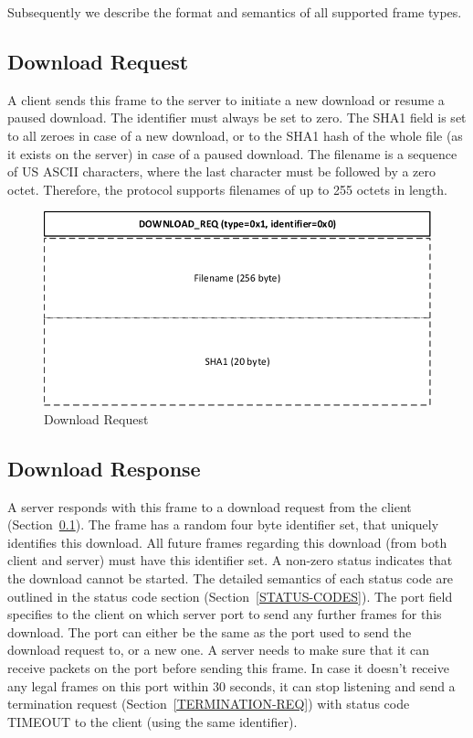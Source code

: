 \documentclass[]{article}
\begin{document}
Subsequently we describe the format and semantics of all supported frame types. 

\subsection{Download Request}
\label{DOWNLOAD-REQ}

A client sends this frame to the server to initiate a new download
or resume a paused download. The identifier must always be set to zero.  
The SHA1 field is set to all zeroes in case of a new download, or to
the SHA1 hash of the whole file (as it exists on the server) 
in case of a paused download. The filename is a sequence of US ASCII
characters, where the last character must be followed by a zero octet.
Therefore, the protocol supports filenames of up to 255 octets in length.

\begin{figure}[H]
\centering
\includegraphics[width=\textwidth]{frames/download-req.pdf}
\caption{Download Request}

\end{figure}

\subsection{Download Response}

A server responds with this frame to a download request from the
client (Section~\ref{DOWNLOAD-REQ}). The frame has a random four 
byte identifier set, that uniquely identifies this download. All
future frames regarding this download (from both client and server)
must have this identifier set. A non-zero status indicates that the
download cannot be started. The detailed semantics of each status code are outlined
in the status code section (Section~\ref{STATUS-CODES}). The port field specifies to the client
on which server port to send any further frames for this download.
The port can either be the same as the port used to send the
download request to, or a new one. A server needs to make sure
that it can receive packets on the port before sending this frame. 
In case it doesn't receive any legal frames on this port within 30
seconds, it can stop listening and send a termination request (Section~\ref{TERMINATION-REQ})
with status code TIMEOUT to the client (using the same identifier).
\end{document}
